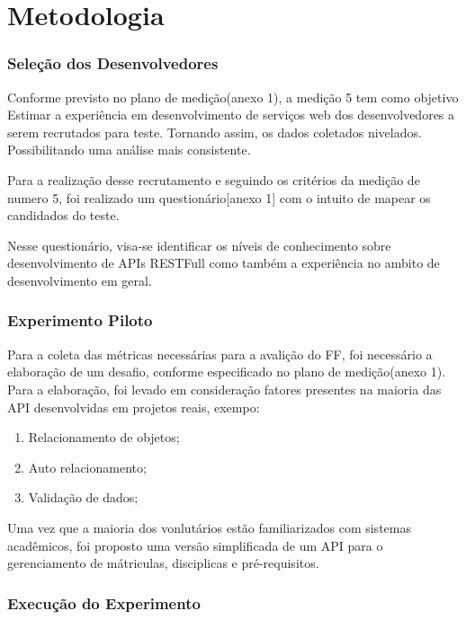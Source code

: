 \chapter[Metodologia]{Metodologia}\label{cap3}

\subsection{Seleção dos Desenvolvedores}

Conforme previsto no plano de medição(anexo 1), a medição 5 tem como objetivo
Estimar a experiência em desenvolvimento de serviços web dos desenvolvedores
a serem recrutados para teste. Tornando assim, os dados coletados nivelados. Possibilitando
uma análise mais consistente.

Para a realização desse recrutamento e seguindo os critérios da medição de numero 5, foi
realizado um questionário[anexo 1] com o intuito de mapear os candidados do teste.

Nesse questionário, visa-se identificar os níveis de conhecimento sobre desenvolvimento
de APIs RESTFull como também a experiência no ambito de desenvolvimento em geral.

\subsection{Experimento Piloto}

Para a coleta das métricas necessárias para a avalição do FF, foi necessário a elaboração
de um desafio, conforme especificado no plano de medição(anexo 1). Para a elaboração, foi levado em consideração
fatores presentes na maioria das API desenvolvidas em projetos reais, exempo:

\begin{enumerate}
  \item Relacionamento de objetos;
  \item Auto relacionamento;
  \item Validação de dados;
\end{enumerate}

Uma vez que a maioria dos vonlutários estão familiarizados com sistemas acadêmicos, foi proposto
uma versão simplificada de um API para o gerenciamento de mátriculas, disciplicas e pré-requisitos.

\subsection{Execução do Experimento}

